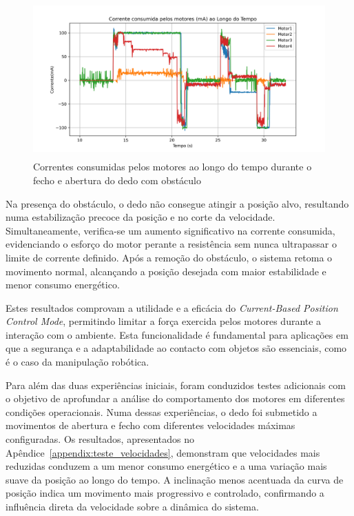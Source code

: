 \begin{figure}[H]
    \centering
    \includegraphics[height=6cm]{figs/chapter4/finger_currents_1.png}
    \caption{Correntes consumidas pelos motores ao longo do tempo durante o fecho e abertura do dedo com obstáculo}
    \label{fig:currs1}
    
\end{figure}

Na presença do obstáculo, o dedo não consegue atingir a posição alvo, resultando numa estabilização precoce da posição e no corte da velocidade. Simultaneamente, verifica-se um aumento significativo na corrente consumida, evidenciando o esforço do motor perante a resistência sem nunca ultrapassar o limite de corrente definido. Após a remoção do obstáculo, o sistema retoma o movimento normal, alcançando a posição desejada com maior estabilidade e menor consumo energético.

Estes resultados comprovam a utilidade e a eficácia do \textit{Current-Based Position Control Mode}, permitindo limitar a força exercida pelos motores durante a interação com o ambiente. Esta funcionalidade é fundamental para aplicações em que a segurança e a adaptabilidade ao contacto com objetos são essenciais, como é o caso da manipulação robótica.

Para além das duas experiências iniciais, foram conduzidos testes adicionais com o objetivo de aprofundar a análise do comportamento dos motores em diferentes condições operacionais. Numa dessas experiências, o dedo foi submetido a movimentos de abertura e fecho com diferentes velocidades máximas configuradas. Os resultados, apresentados no Apêndice~\ref{appendix:teste_velocidades}, demonstram que velocidades mais reduzidas conduzem a um menor consumo energético e a uma variação mais suave da posição ao longo do tempo. A inclinação menos acentuada da curva de posição indica um movimento mais progressivo e controlado, confirmando a influência direta da velocidade sobre a dinâmica do sistema.

